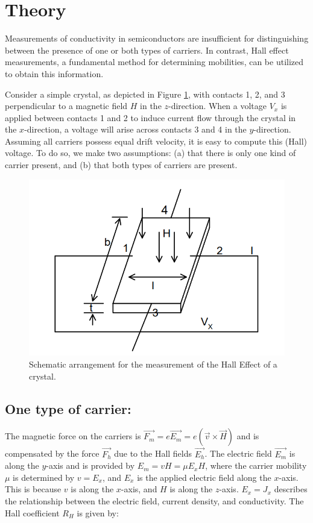 \section{Theory}

	Measurements of conductivity in semiconductors are insufficient for distinguishing between the presence of one or both types of carriers. In contrast, Hall effect measurements, a fundamental method for determining mobilities, can be utilized to obtain this information.

	Consider a simple crystal, as depicted in Figure \ref{th:1}, with contacts 1, 2, and 3 perpendicular to a magnetic field $H$ in the $z$-direction. When a voltage $V_x$ is applied between contacts 1 and 2 to induce current flow through the crystal in the $x$-direction, a voltage will arise across contacts 3 and 4 in the $y$-direction. Assuming all carriers possess equal drift velocity, it is easy to compute this (Hall) voltage. To do so, we make two assumptions: (a) that there is only one kind of carrier present, and (b) that both types of carriers are present.

	\begin{figure}[h]
		\centering
		\includegraphics[width=0.8\columnwidth]{images/h1.png}
		\caption{Schematic arrangement for the measurement of the Hall Effect of a crystal.}
		\label{th:1}
	\end{figure}

	\subsection{One type of carrier:}

		The magnetic force on the carriers is $\Vec{F_m}=e\Vec{E_m}=e(\Vec{v}\times\Vec{H})$ and is compensated by the force $\Vec{F_h}$ due to the Hall fields $\Vec{E_h}$. The electric field $\Vec{E_m}$ is along the $y$-axis and is provided by $E_m = vH = \mu E_xH$, where the carrier mobility $\mu$ is determined by $v = E_x$, and $E_x$ is the applied electric field along the $x$-axis. This is because $v$ is along the $x$-axis, and $H$ is along the $z$-axis. $E_x = J_x$ describes the relationship between the electric field, current density, and conductivity. The Hall coefficient $R_H$ is given by:

